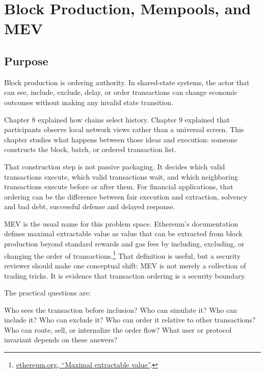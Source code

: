 \chapter{Block Production, Mempools, and MEV}

\section{Purpose}

\begin{principlebox}
Block production is ordering authority. In shared-state systems, the actor that can see, include, exclude, delay, or order transactions can change economic outcomes without making any invalid state transition.
\end{principlebox}

Chapter 8 explained how chains select history. Chapter 9 explained that participants observe local network views rather than a universal screen. This chapter studies what happens between those ideas and execution: someone constructs the block, batch, or ordered transaction list.

That construction step is not passive packaging. It decides which valid transactions execute, which valid transactions wait, and which neighboring transactions execute before or after them. For financial applications, that ordering can be the difference between fair execution and extraction, solvency and bad debt, successful defense and delayed response.

MEV is the usual name for this problem space. Ethereum's documentation defines maximal extractable value as value that can be extracted from block production beyond standard rewards and gas fees by including, excluding, or changing the order of transactions.\footnote{\href{https://ethereum.org/developers/docs/mev/}{ethereum.org, ``Maximal extractable value''}.} That definition is useful, but a security reviewer should make one conceptual shift: MEV is not merely a collection of trading tricks. It is evidence that transaction ordering is a security boundary.

The practical questions are:

\begin{codeblock}
Who sees the transaction before inclusion?
Who can simulate it?
Who can include it?
Who can exclude it?
Who can order it relative to other transactions?
Who can route, sell, or internalize the order flow?
What user or protocol invariant depends on these answers?
\end{codeblock}

